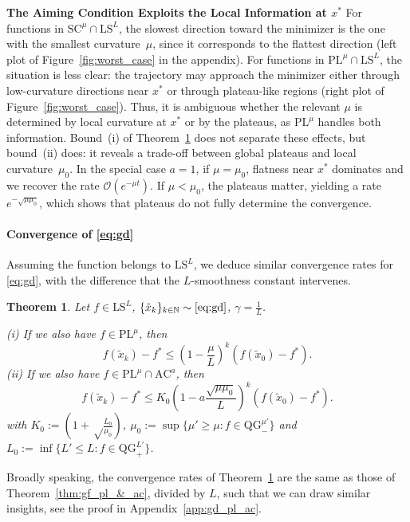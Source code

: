 \documentclass{article}
\def\N{{\mathbb{N}}}
\def\xdisctilde{\{\tilde{x}_k \}_{k\in \N}}
\def\pl{{\text{PL}^\mu}}
\newcommand{\bpar}[1]{\left(#1\right)}
\newcommand{\ls}{\text{LS}^{L}}
\newcommand{\strongconv}{\text{SC}^{\mu}}
\newcommand{\ac}{\text{AC}^{a}}
\newcommand{\qgf}[1]{\text{QG}_{+}^{#1}}
\newcommand{\qginff}[1]{\text{QG}_{-}^{#1}}
\theoremstyle{plain}
\newtheorem{theorem}{Theorem}[section]
\theoremstyle{definition}
\theoremstyle{remark}
\begin{document}
 \noindent\textbf{The Aiming Condition Exploits the Local Information at $x^\ast$ \:} For functions in $\strongconv \cap \ls$, the slowest direction toward the minimizer is the one with the smallest curvature~$\mu$, since it corresponds to the flattest direction (left plot of Figure~\ref{fig:worst_case} in the appendix).  
For functions in $\pl \cap \ls$, the situation is less clear: the trajectory may approach the minimizer either through low-curvature directions near $x^\ast$ or through plateau-like regions (right plot of Figure~\ref{fig:worst_case}). Thus, it is ambiguous whether the relevant $\mu$ is determined by local curvature at $x^\ast$ or by the plateaus, as $\pl$ handles both information.
Bound~(i) of Theorem~\ref{thm:gd_pl_&_ac} does not separate these effects, but bound~(ii) does: it reveals a trade-off between global plateaus and local curvature~$\mu_0$. In the special case $a=1$, if $\mu=\mu_0$, flatness near $x^\ast$ dominates and we recover the rate $\mathcal{O}(e^{-\mu t})$. If $\mu<\mu_0$, the plateaus matter, yielding a rate $e^{-\sqrt{\mu\mu_0}}$, which shows that plateaus do not fully determine the convergence.

\paragraph{Convergence of \eqref{eq:gd}}  Assuming the function belongs to $\ls$, we deduce similar convergence rates for \eqref{eq:gd}, with the difference that the $L$-smoothness constant intervenes.
\begin{theorem}\label{thm:gd_pl_&_ac}
    Let $f \in \ls$, $\xdisctilde \sim \eqref{eq:gd}$, $\gamma = \frac{1}{L}$.

    \noindent
    (i) \cite[Theorem 1]{karimi2016linear} If we also have $f \in \pl$,  then
    $$ f(\tilde x_k)-f^\ast \le \bpar{1-\frac{\mu}{L}}^k(f(\tilde x_0)-f^\ast). $$
    (ii) If we also have $f \in \pl \cap \ac $, then
    $$ f(\tilde x_k)-f^\ast \le  K_0\bpar{1-a\frac{\sqrt{\mu \mu_0}}{L}}^k(f(\tilde x_0)-f^\ast). $$
    with $K_0 := \bpar{1+\sqrt\frac{L_0}{\mu_0}}$, $\mu_0 := \sup\{\mu' \ge \mu: f \in \qginff{\mu'}\} $ and $L_0 :=\inf\{L' \le  L:f \in \qgf{L'}\}$.
\end{theorem}
Broadly speaking, the convergence rates of Theorem~\ref{thm:gd_pl_&_ac} are the same as those of Theorem~\ref{thm:gf_pl_&_ac}, divided by $L$, such that we can draw similar insights, see the proof in Appendix~\ref{app:gd_pl_ac}.
\end{document}

